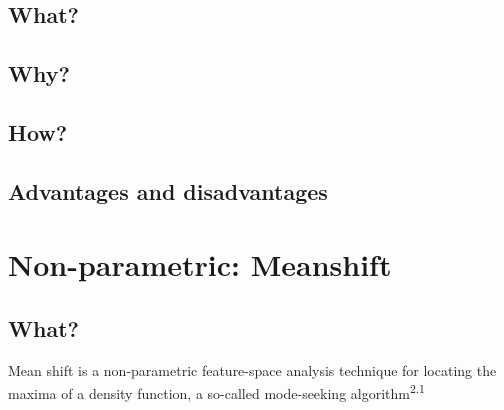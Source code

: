 \documentclass[13pt,a4paper]{report}
\begin{document}
\subsection{What?}

\subsection{Why?}

\subsection{How?}

\subsection{Advantages and disadvantages}


\section{Non-parametric: Meanshift}

\subsection{What?}
Mean shift is a non-parametric feature-space analysis technique for locating the maxima of a density function, a so-called mode-seeking algorithm\textsuperscript{2.1}
\end{document}
